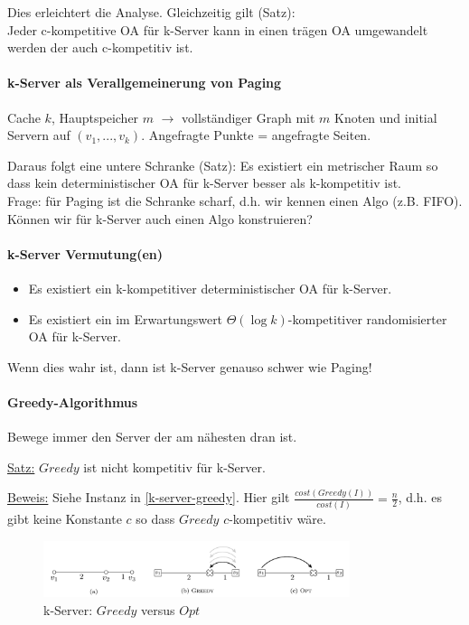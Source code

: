 Dies erleichtert die Analyse. Gleichzeitig gilt (Satz): \\
Jeder c-kompetitive OA für k-Server kann in einen trägen OA umgewandelt werden der auch c-kompetitiv ist.

\paragraph{k-Server als Verallgemeinerung von Paging}
Cache $k$, Hauptspeicher $m$ $\longrightarrow$ vollständiger Graph mit $m$ Knoten und initial
Servern auf $(v_1, ..., v_k)$. Angefragte Punkte = angefragte Seiten.

Daraus folgt eine untere Schranke (Satz):
Es existiert ein metrischer Raum so dass kein deterministischer OA für k-Server besser als k-kompetitiv ist.
\\
Frage: für Paging ist die Schranke scharf, d.h. wir kennen einen Algo (z.B. FIFO).
Können wir für k-Server auch einen Algo konstruieren?

\paragraph{k-Server Vermutung(en)}
\begin{itemize}
    \item Es existiert ein k-kompetitiver deterministischer OA für k-Server.
    \item Es existiert ein im Erwartungswert $\Theta(\log k)$-kompetitiver randomisierter OA für k-Server.
\end{itemize}
Wenn dies wahr ist, dann ist k-Server genauso schwer wie Paging!

\paragraph{Greedy-Algorithmus}
Bewege immer den Server der am nähesten dran ist.

\underline{Satz:}
$Greedy$ ist nicht kompetitiv für k-Server.

\underline{Beweis:}
Siehe Instanz in \autoref{k-server-greedy}.
Hier gilt $\frac{cost(Greedy(I))}{cost(I)} = \frac{n}{2}$, d.h. es gibt keine Konstante $c$
so dass $Greedy$ $c$-kompetitiv wäre.

\begin{figure}[h]
    \centering
    \includegraphics[width=0.8\textwidth]{images/k-server-greedy.png}
    \caption{k-Server: $Greedy$ versus $Opt$}
    \label{k-server-greedy}
\end{figure}


